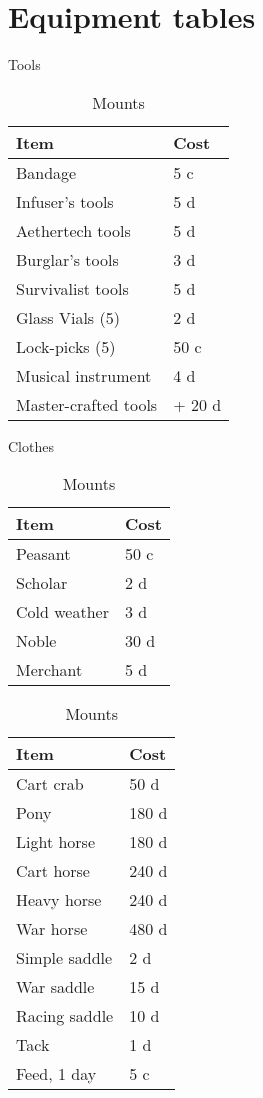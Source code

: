 \documentclass[a4paper,11pt,oneside]{book}
\begin{document}
\chapter{Equipment tables}
\begin{table}[ht]
	\parbox{0.45\hsize}{
	\centering
	\caption{Tools}
	\label{tab:tools}
	\begin{tabular}{|l|l|}
		\hline
		Item & Cost\\ [0.5ex]
		\hline
		Bandage & 5 c\\
		Infuser's tools & 5 d\\
		Aethertech tools & 5 d \\
		Burglar's tools & 3 d \\
		Survivalist tools & 5 d \\
		Glass Vials (5)& 2 d\\
		Lock-picks (5) & 50 c\\
		Musical instrument & 4 d\\		
		\hline
		Master-crafted tools & + 20 d\\
		\hline
	\end{tabular}}
	\parbox{0.45\hsize}{
	\centering
	\caption{Clothes}
	\begin{tabular}{|l|l|}
		\hline
		Item & Cost\\ [0.5ex]
		\hline
		Peasant & 50 c\\
		Scholar & 2 d\\
		Cold weather & 3 d\\
		Noble & 30 d\\
		Merchant & 5 d\\
		\hline
	\end{tabular}}

	\centering
	\caption{Mounts}
	\begin{tabular}{|l|l|}
		\hline
		Item & Cost\\ [0.5ex]
		\hline
		Cart crab & 50 d \\ 
		Pony & 180 d\\
		Light horse & 180 d\\
		Cart horse & 240 d\\
		Heavy horse & 240 d\\
		War horse & 480 d\\
		\hline
		Simple saddle & 2 d\\
		War saddle & 15 d\\
		Racing saddle & 10 d\\
		Tack & 1 d\\
		Feed, 1 day & 5 c\\
		\hline
	\end{tabular}
\end{table}
\end{document}
